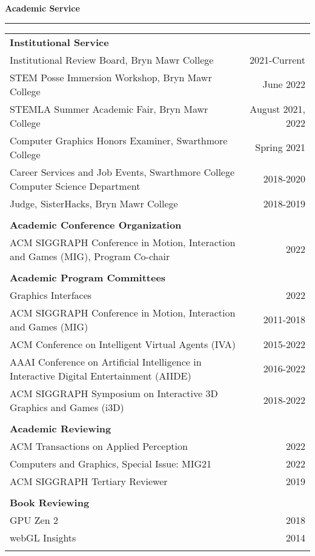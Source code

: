\needspace{6em}
{\large {\bf Academic Service}}
\vspace{0.1cm}
\hrule
\medskip
\begin{tabular*}{7.1in}{@{}l@{\extracolsep\fill}r}

{\bf Institutional Service } & \\
Institutional Review Board, Bryn Mawr College & 2021-Current \\
STEM Posse Immersion Workshop, Bryn Mawr College & June 2022 \\
STEMLA Summer Academic Fair, Bryn Mawr College & August 2021, 2022 \\
Computer Graphics Honors Examiner, Swarthmore College & Spring 2021 \\
Career Services and Job Events, Swarthmore College Computer Science Department & 2018-2020 \\
Judge, SisterHacks, Bryn Mawr College & 2018-2019 \\
\phantom{yommomma} & \phantom{2002}\\

{\bf Academic Conference Organization } & \\
ACM SIGGRAPH Conference in Motion, Interaction and Games (MIG), Program Co-chair & 2022 \\
\phantom{yommomma} & \phantom{2002}\\

{\bf Academic Program Committees } & \\
Graphics Interfaces& 2022 \\
ACM SIGGRAPH Conference in Motion, Interaction and Games (MIG)& 2011-2018 \\
ACM Conference on Intelligent Virtual Agents (IVA)& 2015-2022\\
AAAI Conference on Artificial Intelligence in Interactive Digital Entertainment (AIIDE)& 2016-2022 \\
ACM SIGGRAPH Symposium on Interactive 3D Graphics and Games (i3D)& 2018-2022 \\
\phantom{yommomma} & \phantom{2002}\\

{\bf Academic Reviewing } & \\
ACM Transactions on Applied Perception & 2022 \\
Computers and Graphics, Special Issue: MIG21 & 2022 \\
ACM SIGGRAPH Tertiary Reviewer & 2019 \\
\phantom{yommomma} & \phantom{2002}\\

{\bf Book Reviewing } & \\
GPU Zen 2 & 2018 \\
webGL Insights & 2014 \\
\phantom{yommomma} & \phantom{2002}\\
\end{tabular*}


